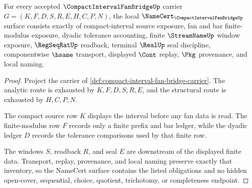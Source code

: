 \begin{theorem}
\label{thm:compact-interval-fan-bridge-namecert-obligations}
For every accepted $\CompactIntervalFanBridgeUp$ carrier $G=(K,F,D,S,R,E,H,C,P,N)$, the local $\NameCert_{\CompactIntervalFanBridgeUp}$ surface consists exactly of compact-interval source exposure, fan and bar finite-modulus exposure, dyadic tolerance accounting, finite $\StreamNameUp$ window exposure, $\RegSeqRatUp$ readback, terminal $\RealUp$ seal discipline, componentwise $\hsame$ transport, displayed $\Cont$ replay, $\Pkg$ provenance, and local naming.
\end{theorem}
\begin{proof}
Project the carrier of \autoref{def:compact-interval-fan-bridge-carrier}. The analytic route is exhausted by $K,F,D,S,R,E$, and the structural route is exhausted by $H,C,P,N$.

The compact source row $K$ displays the interval before any fan data is read. The finite-modulus row $F$ records only a finite prefix and bar ledger, while the dyadic ledger $D$ records the tolerance comparisons used by that finite row.

The windows $S$, readback $R$, and seal $E$ are downstream of the displayed finite data. Transport, replay, provenance, and local naming preserve exactly that inventory, so the NameCert surface contains the listed obligations and no hidden open-cover, sequential, choice, quotient, trichotomy, or completeness endpoint.
\end{proof}

